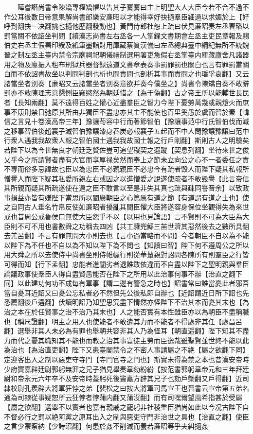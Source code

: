 　　曄嘗譖尚書令陳矯專權矯懼以告其子騫騫曰主上明聖大人大臣今若不合不過不作公耳後數日帝意果解尚書郎樂安亷昭以才能得幸好抉擿羣臣細過以求媚於上【好呼到翻抉一决翻挑也擿他歷翻發動也】黃門侍郎杜恕上疏曰伏見亷昭奏左丞曹璠以罰當關不依詔坐判問【續漢志尚書左右丞各一人掌録文書期會左丞主吏民章報及騶伯史右丞主假署印綬及紙筆墨詣財用庫藏蔡質漢儀曰左丞總典臺中綱紀無所不統魏晉之制左丞主臺内禁令宗廟祠祀朝儀禮制選用署吏急假右丞掌臺内庫藏廬舍凡諸器用之物及廩振人租布刑獄兵器督録遠道文書章表奏事罰罪罰也關白也言有罪罰當關白而不依詔書故坐以判問判剖也析也問責問也剖析其事而責問之也璠孚袁翻】又云諸當坐者别奏【亷昭又云諸當坐者别奏意欲并奏今僕坐之】尚書令陳矯自奏不敢辭罰亦不敢陳理志意懇惻臣竊愍然為朝廷惜之【為于偽翻】古之帝王所以能輔世長民者【長知兩翻】莫不遠得百姓之懽心近盡羣臣之智力今陛下憂勞萬幾或親燈火而庶事不康刑禁日弛原其所由非獨臣不盡忠亦其主不能使也百里奚愚於虞而智於秦【韓信之言見十卷漢高帝三年】豫讓苟容中行而著節智伯【豫讓事范中行氏智伯伐而滅之移事智伯後趙襄子滅智伯豫讓漆身吞炭必報襄子五起而不中人問豫讓豫讓曰范中行衆人遇我我故衆人報之智伯國士遇我我故國士報之行戶剛翻】斯則古人之明驗矣若陛下以為今世無良才朝廷乏賢佐豈可追望稷契之遐蹤【契息列翻】坐待來世之俊乂乎今之所謂賢者盡有大官而享厚禄矣然而奉上之節未立向公之心不一者委任之責不專而俗多忌諱故也臣以為忠臣不必親親臣不必忠今有疏者毁人而陛下疑其私報所憎譽人而陛下疑其私愛所親左右或因之以進憎愛之說遂使疏者不敢毁譽【此言帝信其所親而疑其所疏遂使在遠之臣不敢言以至是非失其真也疏與疎同譽音余】以致政事損益亦皆有嫌陛下當思所以闡廣朝臣之心篤厲有道之節【有道謂有道之士也】使之自同古人垂名竹帛反使如亷昭者擾亂其間臣懼大臣將遂容身保位坐觀得失為來世戒也昔周公戒魯侯曰無使大臣怨乎不以【以用也見論語】言不賢則不可為大臣為大臣則不可不用也書數舜之功稱去四凶【共工驩兜鯀三苖世濟其惡然後去之數所具翻去羌呂翻】不言有罪無問大小則去也【言小過當略而不問】今者朝臣不自以為不能以陛下為不任也不自以為不知以陛下為不問也【知讀曰智】陛下何不遵周公之所以用大舜之所以去使侍中尚書坐則侍帷幄行則從華輦親對詔問各陳所有則羣臣之行皆可得而知【行下孟翻】忠能者進闇劣者退誰敢依違而不自盡以陛下之聖明親與羣臣論議政事使羣臣人得自盡賢愚能否在陛下之所用以此治事何事不辦【治直之翻下同】以此建功何功不成每有軍事【謂二邊有警急之時也】詔書常曰誰當憂此者邪吾當自憂耳近詔又曰憂公忘私者必不然但先公後私即自辦也【近詔謂近日所下詔也先悉薦翻後戶遘翻】伏讀明詔乃知聖思究盡下情然亦怪陛下不治其本而憂其末也【為治之本在於任賢事之治不治乃其末也】人之能否實有本性雖臣亦以為朝臣不盡稱職也【稱尺證翻】明主之用人也使能者不敢遺其力而不能者不得處非其任【處昌呂翻】選舉非其人未必為有罪也舉朝共容非其人乃為怪耳【朝直遥翻】陛下知其不盡力而代之憂其職知其不能也而教之治其事豈徒主勞而臣逸哉雖聖賢並世終不能以此為治也【為治直吏翻】陛下又患臺閣禁令之不密人事請屬之不絶【屬之欲翻下同】定迎客出入之制以惡吏守寺門【寺門官寺之門也】斯實未得為禁之本也昔漢安帝時少府竇嘉辟廷尉郭躬無罪之兄子猶見舉奏章劾紛紛【按范書郭躬章帝元和三年拜廷尉和帝永元六年卒不及安帝時蓋躬死後竇嘉方辟其兄子也劾戶槩翻又戶得翻】近司隸校尉孔羨辟大將軍狂悖之弟【裴松之曰按大將軍司馬宣王也晉書云宣帝第五弟名通為司隸從事疑恕所云狂悖者悖蒲内翻又蒲沒翻】而有司嘿爾望風希指甚於受屬【屬之欲翻】選舉不以實者也嘉有親戚之寵躬非社稷重臣猶尚如此以今况古陛下自不督必行之罰以絶阿黨之原耳出入之制與惡吏守門非治世之具也【治直之翻】使臣之言少蒙察納【少詩沼翻】何患於姦不削滅而養若亷昭等乎夫糾擿姦
